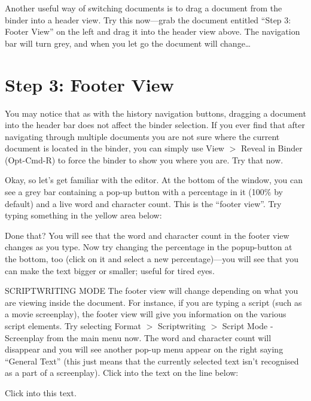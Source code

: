 \documentclass[10pt,oneside]{memoir}
\begin{document}
Another useful way of switching documents is to drag a document from the binder into a header view. Try this now---grab the document entitled ``Step 3: Footer View'' on the left and drag it into the header view above. The navigation bar will turn grey, and when you let go the document will change{\ldots}


\pagebreak \chapter{Step 3: Footer View}
\label{step3:footerview}

You may notice that as with the history navigation buttons, dragging a document into the header bar does not affect the binder selection. If you ever find that after navigating through multiple documents you are not sure where the current document is located in the binder, you can simply use View $>$ Reveal in Binder (Opt-Cmd-R) to force the binder to show you where you are. Try that now.


Okay, so let's get familiar with the editor. At the bottom of the window, you can see a grey bar containing a pop-up button with a percentage in it (100\% by default) and a live word and character count. This is the ``footer view''. Try typing something in the yellow area below:


Done that? You will see that the word and character count in the footer view changes as you type. Now try changing the percentage in the popup-button at the bottom, too (click on it and select a new percentage)---you will see that you can make the text bigger or smaller; useful for tired eyes.


SCRIPTWRITING MODE
The footer view will change depending on what you are viewing inside the document. For instance, if you are typing a script (such as a movie screenplay), the footer view will give you information on the various script elements. Try selecting Format $>$ Scriptwriting $>$ Script Mode - Screenplay from the main menu now. The word and character count will disappear and you will see another pop-up menu appear on the right saying ``General Text'' (this just means that the currently selected text isn't recognised as a part of a screenplay). Click into the text on the line below:


Click into this text.
\end{document}
